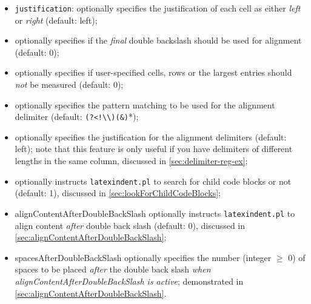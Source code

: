 \begin{itemize}
{        alignment}\texttt{spacesAfterAmpersand}: optionally specifies the number (integer
        $\geq$ 0) of spaces to be placed \emph{After} ampersands (default: 1);
  \item {}\texttt{justification}: optionally specifies the justification of each
        cell as either \emph{left} or \emph{right} (default: left);
  \item {}
        optionally specifies if the \emph{final} double backslash should be used for
        alignment (default: 0);
  \item {} optionally specifies if
        user-specified cells, rows or the largest entries should \emph{not} be measured
        (default: 0);
  \item {} optionally
        specifies the pattern matching to be used for the alignment delimiter (default:
        \lstinline* '(?<!\\)(&)'*);
  \item {} optionally
        specifies the justification for the alignment delimiters (default: left); note
        that this feature is only useful if you have delimiters of different lengths in
        the same column, discussed in \cref{sec:delimiter-reg-ex};
  \item {}
        optionally instructs \texttt{latexindent.pl} to search for child code blocks or
        not (default: 1), discussed in \cref{sec:lookForChildCodeBlocks};
  \item {}
        alignContentAfterDoubleBackSlash optionally instructs \texttt{latexindent.pl} to
        align content \emph{after} double back slash (default: 0), discussed in
        \cref{sec:alignContentAfterDoubleBackSlash};
  \item {}
        spacesAfterDoubleBackSlash optionally specifies the number (integer $\geq$ 0) of
        spaces to be placed \emph{after} the double back slash \emph{when
        alignContentAfterDoubleBackSlash is active}; demonstrated in
        \cref{sec:alignContentAfterDoubleBackSlash}.
 \end{itemize}

